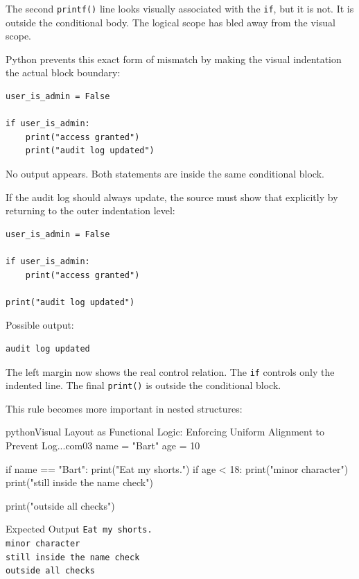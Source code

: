 \documentclass[a4paper,twoside]{report}
\begin{document}
The second \texttt{printf()} line looks visually associated with the \texttt{if}, but it is not. It is outside the conditional body. The logical scope has bled away from the visual scope.

Python prevents this exact form of mismatch by making the visual indentation the actual block boundary:

\begin{verbatim}
user_is_admin = False

if user_is_admin:
    print("access granted")
    print("audit log updated")
\end{verbatim}

No output appears. Both statements are inside the same conditional block.

If the audit log should always update, the source must show that explicitly by returning to the outer indentation level:

\begin{verbatim}
user_is_admin = False

if user_is_admin:
    print("access granted")

print("audit log updated")
\end{verbatim}

Possible output:

\begin{verbatim}
audit log updated
\end{verbatim}

The left margin now shows the real control relation. The \texttt{if} controls only the indented line. The final \texttt{print()} is outside the conditional block.

This rule becomes more important in nested structures:

\begin{codebox}[]{python}{Visual Layout as Functional Logic: Enforcing Uniform Alignment to Prevent Log...}{com03}
name = "Bart"
age = 10

if name == "Bart":
    print("Eat my shorts.")
    if age < 18:
        print("minor character")
    print("still inside the name check")

print("outside all checks")
\end{codebox}


\begin{iobox}{Expected Output}
\texttt{Eat my shorts.} \\
\texttt{minor character} \\
\texttt{still inside the name check} \\
\texttt{outside all checks} \\
\end{iobox}
\end{document}
